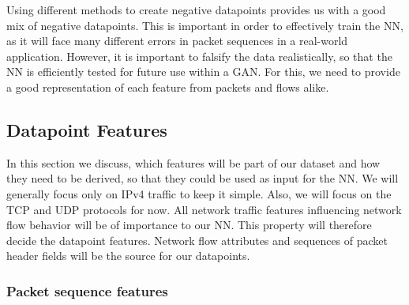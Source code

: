 \documentclass[
	ngerman,
	ruledheaders=section,%
	class=report,%
	thesis={type=bachelor},%
	accentcolor=9c,%
	custommargins=true,%
	marginpar=false,%
	parskip=half-,%
	fontsize=11pt,%
]{tudapub}
\begin{document}
Using different methods to create negative datapoints provides us with a good mix of negative datapoints.
This is important in order to effectively train the NN, as it will face many different errors in packet sequences in a real-world application.
However, it is important to falsify the data realistically, so that the NN is efficiently tested for future use within a GAN.
For this, we need to provide a good representation of each feature from packets and flows alike.

\subsection{Datapoint Features}
\label{sec:datapointFeatures}

In this section we discuss, which features will be part of our dataset and how they need to be derived, so that they could be used as input for the NN.
We will generally focus only on IPv4 traffic to keep it simple.
Also, we will focus on the TCP and UDP protocols for now.
All network traffic features influencing network flow behavior will be of importance to our NN.
This property will therefore decide the datapoint features.
Network flow attributes and sequences of packet header fields will be the source for our datapoints.


\subsubsection{Packet sequence features}
\label{sec:packtFeatures}

\end{document}
